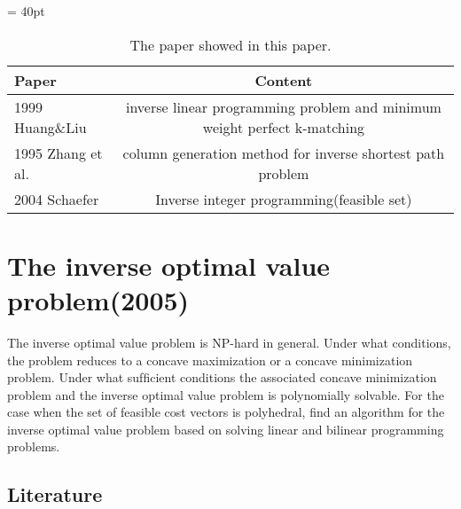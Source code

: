 \documentclass[UTF8]{article}
\begin{document}
\begin{table}[ht]
 
 \tabcolsep = 40pt
 
 \small\renewcommand{}
 
 \caption{The paper showed in this paper.\label{tab:5}}
 
 {\begin{tabular}{lc}
   \hline
   Paper             & Content                                                                  \\
   \hline
   1999 Huang\&Liu   & inverse linear programming problem and minimum weight perfect k-matching \\
   \hline
   1995 Zhang et al. & column generation method for inverse shortest path problem               \\
   \hline
   2004 Schaefer     & Inverse integer programming(feasible set)                                \\
   \hline
  \end{tabular}}
 {}
\end{table}


\section{The inverse optimal value problem(2005)}

The inverse optimal value problem is NP-hard in general. Under what conditions, the problem reduces to a concave maximization or a concave minimization problem. Under what sufﬁcient conditions the associated concave minimization problem and the inverse optimal value problem is polynomially solvable. For the case when the set of feasible cost vectors is polyhedral, find an algorithm for the inverse optimal value problem based on solving linear and bilinear programming problems.


\subsection{Literature}
\end{document}
